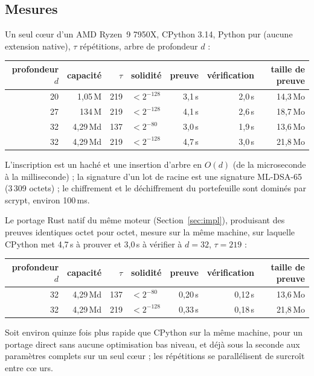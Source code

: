 \documentclass[11pt]{article}
\theoremstyle{definition}
\begin{document}
\subsection{Mesures}

Un seul c\oe ur d'un AMD Ryzen~9 7950X, CPython 3.14, Python pur (aucune extension
native), $\tau$ répétitions, arbre de profondeur $d$ :

\begin{center}
\begin{tabular}{rrrlrrr}
\toprule
profondeur $d$ & capacité & $\tau$ & solidité & preuve & vérification & taille de preuve \\
\midrule
20 & 1,05\,M  & 219 & $< 2^{-128}$ & 3,1\,s & 2,0\,s & 14,3\,Mo \\
27 & 134\,M   & 219 & $< 2^{-128}$ & 4,1\,s & 2,6\,s & 18,7\,Mo \\
32 & 4,29\,Md & 137 & $< 2^{-80}$  & 3,0\,s & 1,9\,s & 13,6\,Mo \\
32 & 4,29\,Md & 219 & $< 2^{-128}$ & 4,7\,s & 3,0\,s & 21,8\,Mo \\
\bottomrule
\end{tabular}
\end{center}

L'inscription est un haché et une insertion d'arbre en $O(d)$ (de la microseconde à la
milliseconde) ; la signature d'un lot de racine est une signature ML-DSA-65 (3\,309
octets) ; le chiffrement et le déchiffrement du portefeuille sont dominés par scrypt,
environ 100\,ms.

Le portage Rust natif du même moteur (Section~\ref{sec:impl}), produisant des preuves
identiques octet pour octet, mesure sur la même machine, sur
laquelle CPython met 4,7\,s à prouver et 3,0\,s à vérifier à $d = 32$, $\tau = 219$ :

\begin{center}
\begin{tabular}{rrrlrrr}
\toprule
profondeur $d$ & capacité & $\tau$ & solidité & preuve & vérification & taille de preuve \\
\midrule
32 & 4,29\,Md & 137 & $< 2^{-80}$  & 0,20\,s & 0,12\,s & 13,6\,Mo \\
32 & 4,29\,Md & 219 & $< 2^{-128}$ & 0,33\,s & 0,18\,s & 21,8\,Mo \\
\bottomrule
\end{tabular}
\end{center}

Soit environ quinze fois plus rapide que CPython sur la même machine, pour un portage
direct sans aucune optimisation bas niveau, et déjà sous la seconde aux paramètres
complets sur un seul c\oe ur ; les répétitions se parallélisent de surcroît entre c\oe
urs.
\end{document}
